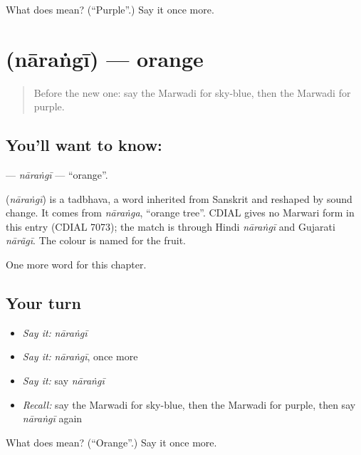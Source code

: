 \begin{tcolorbox}[breakable,colback=teal!4,colframe=teal!35!black,title={Before you move on}]
What does  mean? (\textquotedblleft{}Purple\textquotedblright{}.) Say it once more.
\end{tcolorbox}
\section[\texorpdfstring{\mw{नारंगी} (nāraṅgī)}{नारंगी (nāraṅgī)}]{ (nāraṅgī) — orange}

\label{lesson:MW-C145-narangi}



\begin{quote}
Before the new one: say the Marwadi for sky-blue, then the Marwadi for purple.
\end{quote}

\subsection*{You'll want to know: }
\textbf{} — \emph{nāraṅgī} — \textquotedblleft{}orange\textquotedblright{}.

\begin{cousinweb}
\textbf{} (\emph{nāraṅgī}) is a tadbhava, a word inherited from Sanskrit and reshaped by sound change. It comes from \emph{nāraṅga}, \textquotedblleft{}orange tree\textquotedblright{}. CDIAL gives no Marwari form in this entry (CDIAL 7073); the match is through Hindi \emph{nāraṅgī} and Gujarati \emph{nārãgī}. The colour is named for the fruit.
\end{cousinweb}

\begin{grammarlens}[title={What you've built}]
One more word for this chapter.
\end{grammarlens}

\subsection*{Your turn}
\begin{itemize}
\raggedright
  \item \emph{Say it:} \emph{nāraṅgī}
  \item \emph{Say it:} \emph{nāraṅgī}, once more
  \item \emph{Say it:} say \emph{nāraṅgī}
  \item \emph{Recall:} say the Marwadi for sky-blue, then the Marwadi for purple, then say \emph{nāraṅgī} again
\end{itemize}

\begin{tcolorbox}[breakable,colback=teal!4,colframe=teal!35!black,title={Before you move on}]
What does  mean? (\textquotedblleft{}Orange\textquotedblright{}.) Say it once more.
\end{tcolorbox}
